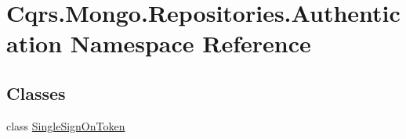 \hypertarget{namespaceCqrs_1_1Mongo_1_1Repositories_1_1Authentication}{}\section{Cqrs.\+Mongo.\+Repositories.\+Authentication Namespace Reference}
\label{namespaceCqrs_1_1Mongo_1_1Repositories_1_1Authentication}
\subsection*{Classes}
\begin{DoxyCompactItemize}
\item 
class \hyperlink{classCqrs_1_1Mongo_1_1Repositories_1_1Authentication_1_1SingleSignOnToken}{Single\+Sign\+On\+Token}
\end{DoxyCompactItemize}
